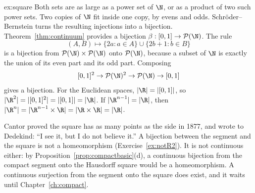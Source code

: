 \begin{solution}{ex:square}
\idea Both sets are as large as a power set of $\N$, or as a product of two such power sets. Two copies of $\N$ fit inside one copy, by evens and odds. Schr\"oder--Bernstein turns the resulting injections into a bijection.
\writeup Theorem~\ref{thm:continuum} provides a bijection $\beta:[0,1]\to\mathcal P(\N)$. The rule
\[
(A,B)\mapsto\{2a:a\in A\}\cup\{2b+1:b\in B\}
\]
is a bijection from $\mathcal P(\N)\times\mathcal P(\N)$ onto $\mathcal P(\N)$, because a subset of $\N$ is exactly the union of its even part and its odd part. Composing
\[
[0,1]^2\to\mathcal P(\N)^2\to\mathcal P(\N)\to[0,1]
\]
gives a bijection. For the Euclidean spaces, $|\R|=|[0,1]|$, so $|\R^2|=|[0,1]^2|=|[0,1]|=|\R|$. If $|\R^{n-1}|=|\R|$, then $|\R^n|=|\R^{n-1}\times\R|=|\R\times\R|=|\R|$.

Cantor proved the square has as many points as the side in 1877, and wrote to Dedekind: ``I see it, but I do not believe it.'' A bijection between the segment and the square is not a homeomorphism (Exercise~\ref{ex:notR2}). It is not continuous either: by Proposition~\ref{prop:compactbasic}(d), a continuous bijection from the compact segment onto the Hausdorff square would be a homeomorphism. A continuous surjection from the segment onto the square does exist, and it waits until Chapter~\ref{ch:compact}.
\end{solution}

